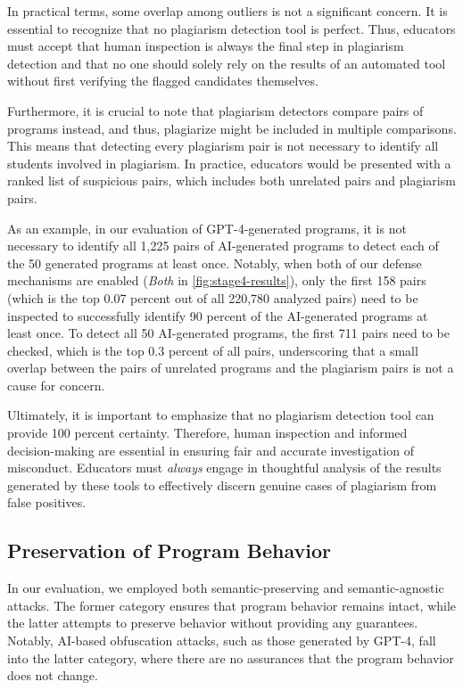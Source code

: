 In practical terms, some overlap among outliers is not a significant concern. It is essential to recognize that no plagiarism detection tool is perfect. Thus, educators must accept that human inspection is always the final step in plagiarism detection and that no one should solely rely on the results of an automated tool without first verifying the flagged candidates themselves. 

Furthermore, it is crucial to note that plagiarism detectors compare pairs of programs instead, and thus, plagiarize might be included in multiple comparisons. This means that detecting every plagiarism pair is not necessary to identify all students involved in plagiarism. In practice, educators would be presented with a ranked list of suspicious pairs, which includes both unrelated pairs and plagiarism pairs.

As an example, in our evaluation of GPT-4-generated programs, it is not necessary to identify all 1,225 pairs of AI-generated programs to detect each of the 50 generated programs at least once.
Notably, when both of our defense mechanisms are enabled (\textit{Both} in \autoref{fig:stage4-results}), only the first 158 pairs (which is the top 0.07 percent out of all 220,780 analyzed pairs) need to be inspected to successfully identify 90 percent of the AI-generated programs at least once. To detect all 50 AI-generated programs, the first 711 pairs need to be checked, which is the top 0.3 percent of all pairs, underscoring that a small overlap between the pairs of unrelated programs and the plagiarism pairs is not a cause for concern.

Ultimately, it is important to emphasize that no plagiarism detection tool can provide 100 percent certainty. Therefore, human inspection and informed decision-making are essential in ensuring fair and accurate investigation of misconduct. Educators must \textit{always} engage in thoughtful analysis of the results generated by these tools to effectively discern genuine cases of plagiarism from false positives.

\subsection{Preservation of Program Behavior}

In our evaluation, we employed both semantic-preserving and semantic-agnostic attacks. The former category ensures that program behavior remains intact, while the latter attempts to preserve behavior without providing any guarantees. Notably, AI-based obfuscation attacks, such as those generated by GPT-4, fall into the latter category, where there are no assurances that the program behavior does not change.

